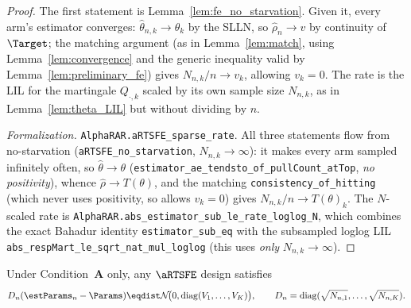 \begin{proof}
The first statement is Lemma~\ref{lem:fe_no_starvation}. Given it, every arm's
estimator converges: $\hat{\theta}_{n,k}\to\theta_k$ by the SLLN, so
$\hat{\rho}_n\to v$ by continuity of $\Target$; the matching argument (as in
Lemma~\ref{lem:match}, using Lemma~\ref{lem:convergence} and the generic
inequality valid by Lemma~\ref{lem:preliminary_fe}) gives $N_{n,k}/n\to v_k$,
allowing $v_k=0$. The rate is the LIL for the martingale $Q_{\cdot,k}$ scaled by
its own sample size $N_{n,k}$, as in Lemma~\ref{lem:theta_LIL} but without
dividing by $n$.

\emph{Formalization.} \texttt{AlphaRAR.aRTSFE\_sparse\_rate}. All three statements flow from
no-starvation (\texttt{aRTSFE\_no\_starvation}, $N_{n,k}\to\infty$): it makes every arm sampled
infinitely often, so $\hat\theta\to\theta$ (\texttt{estimator\_ae\_tendsto\_of\_pullCount\_atTop},
\emph{no positivity}), whence $\hat\rho\to T(\theta)$, and the matching
\texttt{consistency\_of\_hitting} (which never uses positivity, so allows $v_k=0$) gives
$N_{n,k}/n\to T(\theta)_k$. The $N$-scaled rate is \texttt{AlphaRAR.abs\_estimator\_sub\_le\_rate\_loglog\_N},
which combines the exact Bahadur identity \texttt{estimator\_sub\_eq} with the subsampled loglog LIL
\texttt{abs\_respMart\_le\_sqrt\_nat\_mul\_loglog} (this uses \emph{only} $N_{n,k}\to\infty$).
\end{proof}

\begin{corollary}\label{cor:sparse_clt}
Under Condition~\textbf{A} only, any $\aRTSFE$ design satisfies
\[
  D_n(\estParams_n-\Params)\eqdist\mathcal{N}\!\big(0,\mathrm{diag}(V_1,\dots,V_K)\big),
  \qquad D_n=\mathrm{diag}(\sqrt{N_{n,1}},\dots,\sqrt{N_{n,K}}).
\]
\end{corollary}

\leanok

